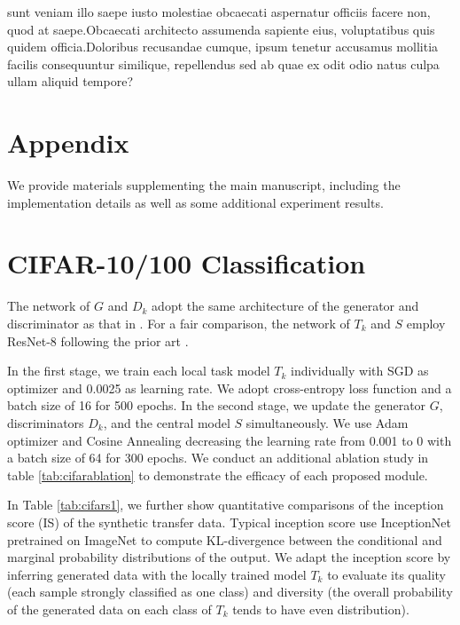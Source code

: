 \documentclass[letterpaper]{article} %
\begin{document}
sunt veniam illo saepe iusto molestiae obcaecati aspernatur officiis facere non, quod at saepe.Obcaecati architecto assumenda sapiente eius, voluptatibus quis quidem officia.Doloribus recusandae cumque, ipsum tenetur accusamus mollitia facilis consequuntur similique, repellendus sed ab quae ex odit odio natus culpa ullam aliquid tempore?\clearpage








\section*{\LARGE\textbf Appendix}

We provide materials supplementing the main manuscript, including the implementation details as well as some additional experiment results. %

\section{CIFAR-10/100 Classification}
The network of $G$ and $D_k$ adopt the same architecture of the generator and discriminator as that in \cite{fang2021mosaicking}. For a fair comparison, the network of $T_k$ and $S$ employ ResNet-8 following the prior art \cite{lin2020ensemble}.

In the first stage, we train each local task model $T_k$ individually with SGD as optimizer and 0.0025 as learning rate. We adopt cross-entropy loss function and a batch size of 16 for 500 epochs.
In the second stage, we update the generator $G$, discriminators $D_k$, and the central model $S$ simultaneously. We use Adam optimizer and Cosine Annealing decreasing the learning rate from 0.001 to 0 with a batch size of 64 for 300 epochs. We conduct an additional ablation study in table \ref{tab:cifarablation} to demonstrate the efficacy of each proposed module.

In Table \ref{tab:cifars1}, we further show quantitative comparisons of the inception score (IS) of the synthetic transfer data. Typical inception score use InceptionNet \cite{szegedy2017inception} pretrained on ImageNet\cite{deng2009imagenet} to compute KL-divergence between the conditional and marginal probability distributions of the output. We adapt the inception score by inferring generated data with the locally trained model $T_k$ to evaluate its quality (each sample strongly classified as one class) and diversity (the overall probability of the generated data on each class of  $T_k$ tends to have even distribution).
\end{document}
